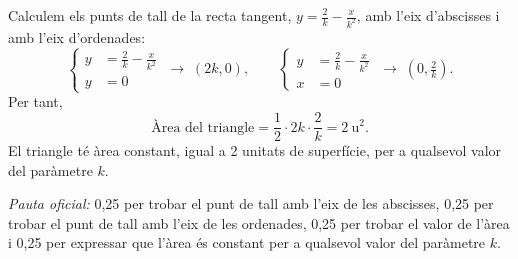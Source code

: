\begin{apartats}
\begin{solucio}
Calculem els punts de tall de la recta tangent, $y=\frac2k-\frac{x}{k^2}$, amb l'eix d'abscisses i amb l'eix
d'ordenades:
\[
\left\{\begin{aligned}y&=\tfrac2k-\tfrac{x}{k^2}\\y&=0\end{aligned}\right.\;\rightarrow\;(2k,0),\qquad
\left\{\begin{aligned}y&=\tfrac2k-\tfrac{x}{k^2}\\x&=0\end{aligned}\right.\;\rightarrow\;\left(0,\tfrac2k\right).
\]
Per tant,
\[
\text{Àrea del triangle}=\frac12\cdot2k\cdot\frac2k=2\ \text{u}^2 .
\]
El triangle té àrea constant, igual a 2 unitats de superfície, per a qualsevol valor del paràmetre $k$.

\textit{Pauta oficial:} 0,25 per trobar el punt de tall amb l'eix de les abscisses, 0,25 per trobar el punt de
tall amb l'eix de les ordenades, 0,25 per trobar el valor de l'àrea i 0,25 per expressar que l'àrea és constant
per a qualsevol valor del paràmetre $k$.
\end{solucio}

\end{apartats}
